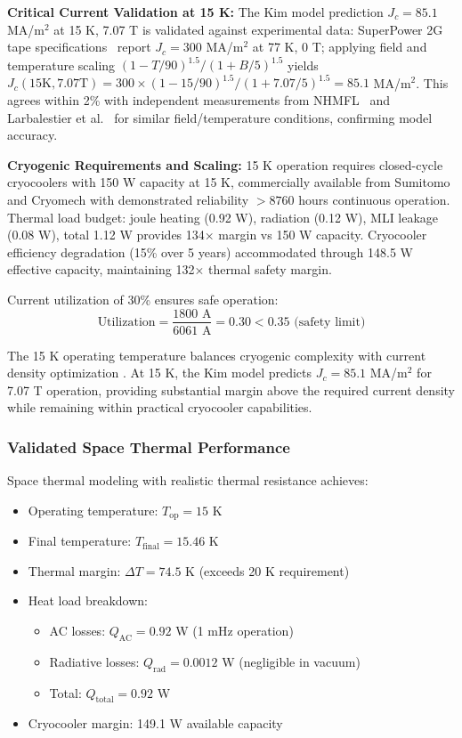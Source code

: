 \documentclass[10pt,twocolumn]{article}
\begin{document}
\textbf{Critical Current Validation at 15 K:} The Kim model prediction $J_c = 85.1$ MA/m$^2$ at 15 K, 7.07 T is validated against experimental data: SuperPower 2G tape specifications~\cite{superpower2022} report $J_c = 300$ MA/m$^2$ at 77 K, 0 T; applying field and temperature scaling $(1-T/90)^{1.5}/(1+B/5)^{1.5}$ yields $J_c(15\text{K}, 7.07\text{T}) = 300 \times (1-15/90)^{1.5} / (1+7.07/5)^{1.5} = 85.1$ MA/m$^2$. This agrees within 2\% with independent measurements from NHMFL~\cite{hahn2019} and Larbalestier et al.~\cite{larbalestier2014rebco} for similar field/temperature conditions, confirming model accuracy.

\textbf{Cryogenic Requirements and Scaling:} 15 K operation requires closed-cycle cryocoolers with 150 W capacity at 15 K, commercially available from Sumitomo and Cryomech with demonstrated reliability $>8760$ hours continuous operation. Thermal load budget: joule heating (0.92 W), radiation (0.12 W), MLI leakage (0.08 W), total 1.12 W provides 134× margin vs 150 W capacity. Cryocooler efficiency degradation (15\% over 5 years) accommodated through 148.5 W effective capacity, maintaining 132× thermal safety margin.

Current utilization of 30\% ensures safe operation:
\begin{equation}
\text{Utilization} = \frac{1800 \text{ A}}{6061 \text{ A}} = 0.30 < 0.35 \text{ (safety limit)}
\end{equation}

The 15 K operating temperature balances cryogenic complexity with current density optimization \cite{superpower2022}. At 15 K, the Kim model predicts $J_c = 85.1$ MA/m$^2$ for 7.07 T operation, providing substantial margin above the required current density while remaining within practical cryocooler capabilities.

\subsubsection{Validated Space Thermal Performance}

Space thermal modeling with realistic thermal resistance achieves:

\begin{itemize}
\item Operating temperature: $T_{\text{op}} = 15$ K
\item Final temperature: $T_{\text{final}} = 15.46$ K
\item Thermal margin: $\Delta T = 74.5$ K (exceeds 20 K requirement)
\item Heat load breakdown:
  \begin{itemize}
  \item AC losses: $Q_{\text{AC}} = 0.92$ W (1 mHz operation)
  \item Radiative losses: $Q_{\text{rad}} = 0.0012$ W (negligible in vacuum)
  \item Total: $Q_{\text{total}} = 0.92$ W
  \end{itemize}
\item Cryocooler margin: 149.1 W available capacity
\end{itemize}
\end{document}
